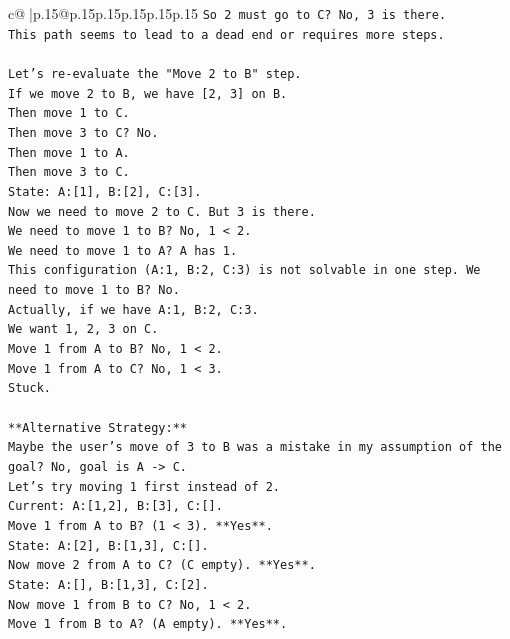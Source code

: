 \documentclass{article}
\begin{document}
{\begin{supertabular}{c@{$\;$}|p{.15\linewidth}@{}p{.15\linewidth}p{.15\linewidth}p{.15\linewidth}p{.15\linewidth}p{.15\linewidth}}
{{{\texttt{So 2 must go to C? No, 3 is there.} \\
\texttt{This path seems to lead to a dead end or requires more steps.} \\
\\ 
\texttt{Let's re{-}evaluate the "Move 2 to B" step.} \\
\texttt{If we move 2 to B, we have {[}2, 3{]} on B.} \\
\texttt{Then move 1 to C.} \\
\texttt{Then move 3 to C? No.} \\
\texttt{Then move 1 to A.} \\
\texttt{Then move 3 to C.} \\
\texttt{State: A:{[}1{]}, B:{[}2{]}, C:{[}3{]}.} \\
\texttt{Now we need to move 2 to C. But 3 is there.} \\
\texttt{We need to move 1 to B? No, 1 < 2.} \\
\texttt{We need to move 1 to A? A has 1.} \\
\texttt{This configuration (A:1, B:2, C:3) is not solvable in one step. We need to move 1 to B? No.} \\
\texttt{Actually, if we have A:1, B:2, C:3.} \\
\texttt{We want 1, 2, 3 on C.} \\
\texttt{Move 1 from A to B? No, 1 < 2.} \\
\texttt{Move 1 from A to C? No, 1 < 3.} \\
\texttt{Stuck.} \\
\\ 
\texttt{**Alternative Strategy:**} \\
\texttt{Maybe the user's move of 3 to B was a mistake in my assumption of the goal? No, goal is A {-}> C.} \\
\texttt{Let's try moving 1 first instead of 2.} \\
\texttt{Current: A:{[}1,2{]}, B:{[}3{]}, C:{[}{]}.} \\
\texttt{Move 1 from A to B? (1 < 3). **Yes**.} \\
\texttt{State: A:{[}2{]}, B:{[}1,3{]}, C:{[}{]}.} \\
\texttt{Now move 2 from A to C? (C empty). **Yes**.} \\
\texttt{State: A:{[}{]}, B:{[}1,3{]}, C:{[}2{]}.} \\
\texttt{Now move 1 from B to C? No, 1 < 2.} \\
\texttt{Move 1 from B to A? (A empty). **Yes**.} \\
}}}
\end{supertabular}}
\end{document}
